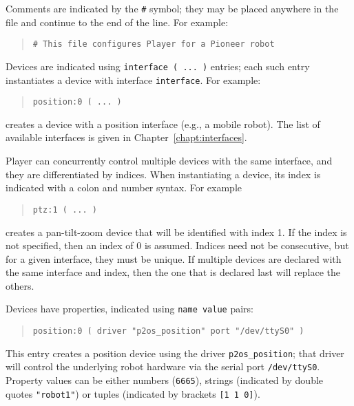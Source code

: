 \documentclass[11pt]{report}
\begin{document}
Comments are indicated by the \verb'#' symbol; they may be placed
anywhere in the file and continue to the end of the line.  For
example:
\begin{quote}
\begin{verbatim}
# This file configures Player for a Pioneer robot
\end{verbatim}
\end{quote}
Devices are indicated using \verb+interface ( ... )+ entries; each such
entry instantiates a device with interface \verb+interface+.  For example:
\begin{quote}
\begin{verbatim}
position:0 ( ... )
\end{verbatim}
\end{quote}
creates a device with a position interface (e.g., a mobile robot).  The
list of available interfaces is given in Chapter~\ref{chapt:interfaces}.

Player can concurrently control multiple devices with the same interface,
and they are differentiated by indices.  When instantiating a device, its
index is indicated with a colon and number syntax.  For example
\begin{quote}
\begin{verbatim}
ptz:1 ( ... )
\end{verbatim}
\end{quote}
creates a pan-tilt-zoom device that will be identified with index 1.  If the
index is not specified, then an index of 0 is assumed.  Indices need not be
consecutive, but for a given interface, they must be unique.  If multiple 
devices are declared with the same interface and index, then the one that is
declared last will replace the others.

Devices have properties, indicated using \verb'name value' pairs:
\begin{quote}
\begin{verbatim}
position:0 ( driver "p2os_position" port "/dev/ttyS0" )
\end{verbatim}
\end{quote}
This entry creates a position device using the driver \verb+p2os_position+;
that driver will control the underlying robot hardware via the serial port
\verb+/dev/ttyS0+.  Property values can be either numbers (\verb'6665'),
strings (indicated by double quotes \verb'"robot1"') or tuples (indicated
by brackets \verb'[1 1 0]').
\end{document}
